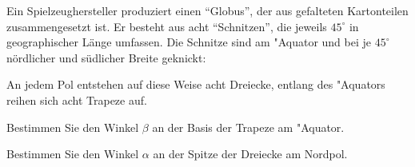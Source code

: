 Ein Spielzeughersteller produziert einen ``Globus'', der aus gefalteten
Kartonteilen zusammengesetzt ist. Er besteht aus acht ``Schnitzen'',
die jeweils $45^\circ$ in geographischer Länge umfassen. Die Schnitze
sind am "Aquator und bei je $45^\circ$ nördlicher und südlicher Breite
geknickt:
\begin{center}
\end{center}
An jedem Pol entstehen auf diese Weise acht Dreiecke, entlang des
"Aquators reihen sich acht Trapeze auf.
\begin{teilaufgaben}
\item
Bestimmen Sie den Winkel $\beta$ an der Basis der Trapeze am "Aquator.
\item Bestimmen Sie den Winkel $\alpha$ an der Spitze der Dreiecke am Nordpol.
\end{teilaufgaben}


